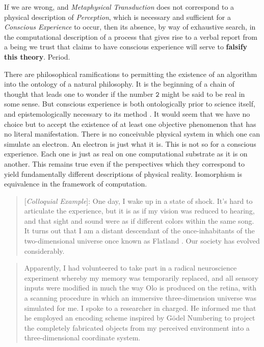 \documentclass[runningheads]{llncs}
\begin{document}
If we are wrong, and \emph{Metaphysical Transduction} does not correspond to a physical description of \emph{Perception}, which is necessary and sufficient for a \emph{Conscious Experience} to occur, then its absence, by way of exhaustive search, in the computational description of a process that gives rise to a verbal report from a being we trust that claims to have conscious experience will serve to \textbf{falsify this theory}. Period.

There are philosophical ramifications to permitting the existence of an algorithm into the ontology of a natural philosophy. It is the beginning of a chain of thought that leads one to wonder if the number $\texttt{2}$ might be said to be real in some sense. But conscious experience is both ontologically prior to science itself, and epistemologically necessary to its method \cite{Chalmers1996} \cite{KantSynthetic}. It would seem that we have no choice but to accept the existence of at least one objective phenomenon that has no literal manifestation. There is no conceivable physical system in which one can simulate an electron. An electron is just what it is. This is not so for a conscious experience. Each one is just as real on one computational substrate as it is on another. This remains true even if the perspectives which they correspond to yield fundamentally different descriptions of physical reality. Isomorphism is equivalence in the framework of computation.

\begin{quote}
[\emph{Colloquial Example}]: One day, I wake up in a state of shock. It's hard to articulate the experience, but it is as if my vision was reduced to hearing, and that sight and sound were as if different colors within the same song. It turns out that I am a distant descendant of the once-inhabitants of the two-dimensional universe once known as Flatland \cite{Flatland1884}. Our society has evolved considerably.
\end{quote}

\begin{quote}
Apparently, I had volunteered to take part in a radical neuroscience experiment whereby my memory was temporarily replaced, and all sensory inputs were modified in much the way Olo is produced on the retina, with a scanning procedure in which an immersive three-dimension universe was simulated for me. I spoke to a researcher in charged. He informed me that he employed an encoding scheme inspired by Gödel Numbering to project the completely fabricated objects from my perceived environment into a three-dimensional coordinate system.
\end{quote}
\end{document}
